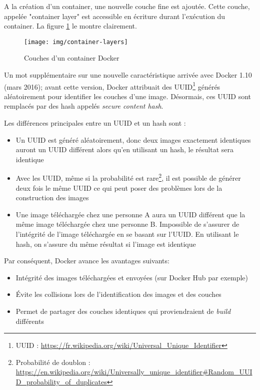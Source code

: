 A la création d'un container, une nouvelle couche fine est ajoutée. Cette couche, appelée "container layer" est accessible en écriture durant l'exécution du container. La figure \ref{docker-container-layers} le montre clairement.

\begin{figure}[hbtp]
\centering
\texttt{[image: img/container-layers]}
\caption{Couches d'un container Docker}
\label{docker-container-layers}
\end{figure}

Un mot supplémentaire sur une nouvelle caractéristique arrivée avec Docker 1.10 (mars 2016); avant cette version, Docker attribuait des UUID\footnote{UUID : \url{https://fr.wikipedia.org/wiki/Universal_Unique_Identifier}} générés aléatoirement pour identifier les couches d'une image. Désormais, ces UUID sont remplacés par des hash appelés \textit{secure content hash}.

Les différences principales entre un UUID et un hash sont :
\begin{itemize}
\item Un UUID est généré aléatoirement, donc deux images exactement identiques auront un UUID différent alors qu'en utilisant un hash, le résultat sera identique
\item Avec les UUID, même si la probabilité est rare\footnote{Probabilité de doublon : \url{https://en.wikipedia.org/wiki/Universally_unique_identifier\#Random_UUID_probability_of_duplicates}}, il est possible de générer deux fois le même UUID ce qui peut poser des problèmes lors de la construction des images
\item Une image téléchargée chez une personne A aura un UUID différent que la même image téléchargée chez une personne B. Impossible de s'assurer de l'intégrité de l'image téléchargée en se basant sur l'UUID. En utilisant le hash, on s'assure du même résultat si l'image est identique
\end{itemize}

\vspace{2mm}
Par conséquent, Docker avance les avantages suivants:
\begin{itemize}
\item Intégrité des images téléchargées et envoyées (sur Docker Hub par exemple)
\item Évite les collisions lors de l'identification des images et des couches
\item Permet de partager des couches identiques qui proviendraient de \textit{build} différents
\end{itemize}

